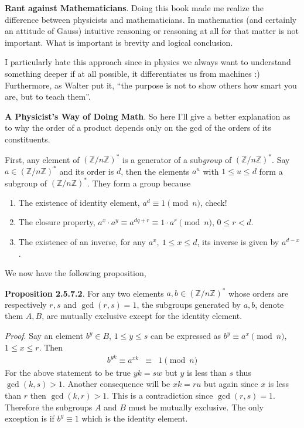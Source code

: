 \documentclass[aps,preprint,preprintnumbers,nofootinbib,showpacs,prd]{revtex4-1}
\newcommand{\nbea}{\begin{eqnarray*}}
\newcommand{\neea}{\end{eqnarray*}}
\begin{document}
{\bf Rant against Mathematicians}. Doing this book made me realize the difference between physicists and mathematicians. In mathematics (and certainly an attitude of Gauss) intuitive reasoning or reasoning at all for that matter is not important. What is important is brevity and logical conclusion.

I particularly hate this approach since in physics we always want to understand something deeper if at all possible, it differentiates us from machines :) Furthermore, as Walter put it, ``the purpose is not to show others how smart you are, but to teach them''.

{\bf A Physicist's Way of Doing Math}. So here I'll give a better explanation as to why the order of a product depends only on the gcd of the orders of its constituents.

First, any element of $(\mathbb{Z}/n\mathbb{Z})^*$ is a generator of a sub{\it group} of $(\mathbb{Z}/n\mathbb{Z})^*$. Say $a \in (\mathbb{Z}/n\mathbb{Z})^*$ and its order is $d$, then the elements $a^u$ with $1 \le u \le d$ form a subgroup of $(\mathbb{Z}/n\mathbb{Z})^*$. They form a group because
%
\begin{enumerate}
\item The existence of identity element, $a^d \equiv 1 \pmod{n}$, check!
\item The closure property, $a^x \cdot a^y \equiv a^{dq + r} \equiv 1 \cdot a^r \pmod{n}$, $0 \le r < d$.
\item The existence of an inverse, for any $a^x,~ 1 \le x \le d$, its inverse is given by $a^{d-x}$.
\end{enumerate}
%
We now have the following proposition,

{\bf Proposition 2.5.7.2}. For any two elements $a, b \in (\mathbb{Z}/n\mathbb{Z})^*$ whose orders are respectively $r,s$ and $\gcd(r,s) = 1$, the subgroups generated by $a, b$, denote them $A, B$, are mutually exclusive except for the identity element.

{\it Proof}. Say an element $b^y \in B$, $1 \le y \le s$ can be expressed as $b^y \equiv a^x \pmod{n}$, $1 \le x \le r$. Then
%
\nbea
b^{yk} \equiv a^{xk} & \equiv & 1 \pmod{n}
\neea
%
For the above statement to be true $yk = sw$ but $y$ is less than $s$ thus $\gcd(k, s) > 1$. Another consequence will be $xk = ru$ but again since $x$ is less than $r$ then $\gcd(k, r) > 1$. This is a contradiction since $\gcd(r,s) = 1$. Therefore the subgroups $A$ and $B$ must be mutually exclusive. The only exception is if $b^y \equiv 1$ which is the identity element.
 
\end{document}
